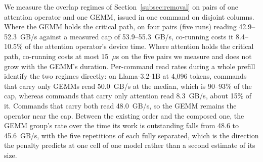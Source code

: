 We measure the overlap regimes of Section~\ref{subsec:removal} on pairs of one attention operator and one GEMM, issued in one command on disjoint columns.
Where the GEMM holds the critical path, on four pairs (five runs) reading 42.9--52.3~GB/s against a measured cap of 53.9--55.3~GB/s, co-running costs it 8.4--10.5\% of the attention operator's device time.
Where attention holds the critical path, co-running costs at most 15~$\mu$s on the five pairs we measure and does not grow with the GEMM's duration.
Per-command read rates during a whole prefill identify the two regimes directly: on Llama-3.2-1B at 4{,}096 tokens, commands that carry only GEMMs read 50.0~GB/s at the median, which is 90--93\% of the cap, whereas commands that carry only attention read 8.3~GB/s, about 15\% of it.
Commands that carry both read 48.0~GB/s, so the GEMM remains the operator near the cap.
Between the existing order and the composed one, the GEMM group's rate over the time its work is outstanding falls from 48.6 to 45.6~GB/s, with the five repetitions of each fully separated, which is the direction the penalty predicts at one cell of one model rather than a second estimate of its size.



